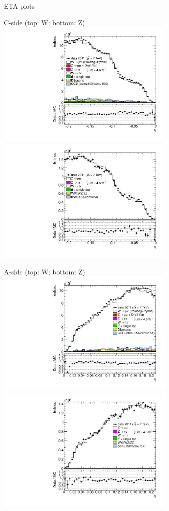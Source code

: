 
{
\Huge ETA plots
}


{

\colb[T]

C-side (top: W; bottom: Z)
\centering
\includegraphics[width=0.66\textwidth]{dates/20130306/figures/etaphi/W_1_C_stack_l_eta_POS} \\
\includegraphics[width=0.66\textwidth]{dates/20130306/figures/etaphi/Z_1_C_stack_lP_eta_ALL.pdf}

A-side (top: W; bottom: Z)
\centering
\includegraphics[width=0.66\textwidth]{dates/20130306/figures/etaphi/W_1_A_stack_l_eta_POS} \\
\includegraphics[width=0.66\textwidth]{dates/20130306/figures/etaphi/Z_1_A_stack_lP_eta_ALL.pdf} 

\cole
}


